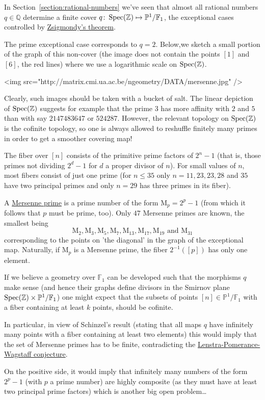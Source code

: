 In Section~\ref{section:rational-numbers} we've seen that almost all rational numbers $q \in \mathbb{Q}$ determine a finite cover $q\colon\operatorname{Spec}(\mathbb{Z}) \mapsto \mathbb{P}^1 / \mathbb{F}_1$, the exceptional cases controlled by \href{http://en.wikipedia.org/wiki/Zsigmondy's_theorem}{Zsigmondy's theorem}.

The prime exceptional case corresponds to $q=2$. Below,we sketch a small portion of the graph of this non-cover (the image does not contain the points $[1]$ and $[6]$, the red lines) where we use a logarithmic scale on $\operatorname{Spec}(\mathbb{Z})$.

<img src="http://matrix.cmi.ua.ac.be/ngeometry/DATA/mersenne.jpg" />

Clearly, such images should be taken with a bucket of salt. The linear depiction of $\operatorname{Spec}(\mathbb{Z})$ suggests for example that the prime $3$ has more affinity with $2$ and $5$ than with say $2147483647$ or $524287$. However, the relevant topology on $\operatorname{Spec}(\mathbb{Z})$ is the cofinite topology, so one is always allowed to reshuffle finitely many primes in order to get a smoother covering  map!

The fiber over $[n]$ consists of the primitive prime factors of $2^n-1$ (that is, those primes not dividing $2^d-1$ for $d$ a proper divisor of $n$). For small values of $n$, most fibers consist of just one prime (for $n \leq 35$ only $n=11,23,23,28$ and $35$ have two principal primes and only $n=29$ has three primes in its fiber).

A \href{http://en.wikipedia.org/wiki/Mersenne_prime}{Mersenne prime} is a prime number of the form $\mathrm{M}_p = 2^p-1$ (from which it follows that $p$ must be prime, too). Only $47$ Mersenne primes are known, the smallest being
\begin{equation}
  \mathrm{M}_2,\mathrm{M}_3,\mathrm{M}_5,\mathrm{M}_7,\mathrm{M}_{13},\mathrm{M}_{17},\mathrm{M}_{19}\text{ and }\mathrm{M}_{31}
\end{equation}
corresponding to the points on 'the diagonal' in the graph of the exceptional map. Naturally, if $\mathrm{M}_p$ is a Mersenne prime, the fiber $2^{-1}([p])$ has only one element.

If we believe a geometry over $\mathbb{F}_1$ can be developed such that the morphisms $q$ make sense (and hence their graphs define divisors in the Smirnov plane $\operatorname{Spec}(\mathbb{Z}) \times \mathbb{P}^1 / \mathbb{F}_1$) one might expect that the subsets of points $[n] \in \mathbb{P}^1 / \mathbb{F}_1$ with a fiber containing at least $k$ points, should be cofinite.

In particular, in view of Schinzel's result (stating that all maps $q$ have infinitely many points with a fiber containing at least two elements) this would imply that the set of Mersenne primes has to be finite, contradicting the \href{http://en.wikipedia.org/wiki/Lenstra-Pomerance-Wagstaff_conjecture}{Lenstra-Pomerance-Wagstaff conjecture}.

On the positive side, it would imply that infinitely many numbers of the form $2^p-1$ (with $p$ a prime number) are highly composite (as they must have at least two principal prime factors) which is another big open problem\ldots
